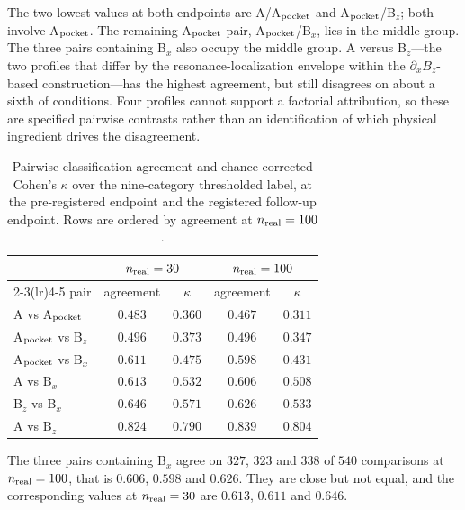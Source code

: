 \documentclass[aip,jap,reprint,onecolumn,superscriptaddress,longbibliography]{revtex4-2}
\begin{document}
The two lowest values at both endpoints are A/A$_{\rm pocket}$ and
A$_{\rm pocket}$/B$_z$; both involve A$_{\rm pocket}$. The remaining
A$_{\rm pocket}$ pair, A$_{\rm pocket}$/B$_x$, lies in the middle group. The
three pairs containing B$_x$ also occupy the middle group. A versus B$_z$---the
two profiles that differ by the resonance-localization envelope within the
$\partial_x B_z$-based construction---has the highest agreement, but still
disagrees on about a sixth of conditions. Four profiles cannot support a
factorial attribution, so these are specified pairwise contrasts rather than an
identification of which physical ingredient drives the disagreement.

\begin{table}[t]
\centering
\caption{Pairwise classification agreement and chance-corrected Cohen's
$\kappa$ over the nine-category thresholded label, at the pre-registered
endpoint and the registered follow-up endpoint. Rows are ordered by agreement at
$n_{\rm real}=100$.}
\label{tab:kappa}
\small
\begin{tabular}{lcccc}
\toprule
 & \multicolumn{2}{c}{$n_{\rm real}=30$} & \multicolumn{2}{c}{$n_{\rm real}=100$} \\
\cmidrule(lr){2-3}\cmidrule(lr){4-5}
pair & agreement & $\kappa$ & agreement & $\kappa$ \\
\midrule
A vs A$_{\rm pocket}$         & $0.483$ & $0.360$ & $0.467$ & $0.311$ \\
A$_{\rm pocket}$ vs B$_z$     & $0.496$ & $0.373$ & $0.496$ & $0.347$ \\
A$_{\rm pocket}$ vs B$_x$     & $0.611$ & $0.475$ & $0.598$ & $0.431$ \\
A vs B$_x$                    & $0.613$ & $0.532$ & $0.606$ & $0.508$ \\
B$_z$ vs B$_x$                & $0.646$ & $0.571$ & $0.626$ & $0.533$ \\
A vs B$_z$                    & $0.824$ & $0.790$ & $0.839$ & $0.804$ \\
\bottomrule
\end{tabular}
\end{table}

The three pairs containing B$_x$ agree on $327$, $323$ and $338$ of $540$
comparisons at $n_{\rm real}=100$, that is $0.606$, $0.598$ and $0.626$. They
are close but not equal, and the corresponding values at $n_{\rm real}=30$ are
$0.613$, $0.611$ and $0.646$.
\end{document}
